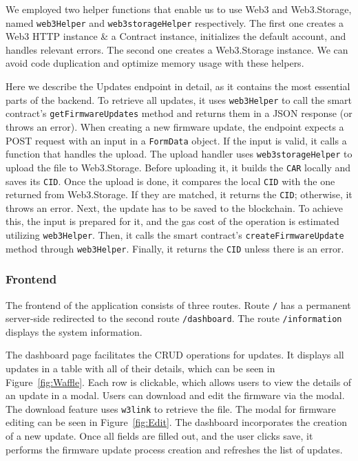 \documentclass[conference]{IEEEtran}
\begin{document}
We employed two helper functions that enable us to use Web3 and Web3.Storage, named \texttt{web3Helper} and \texttt{web3storageHelper} respectively. The first one creates a Web3 HTTP instance \& a Contract instance, initializes the default account, and handles relevant errors. The second one creates a Web3.Storage instance. We can avoid code duplication and optimize memory usage with these helpers.

Here we describe the Updates endpoint in detail, as it contains the most essential parts of the backend. To retrieve all updates, it uses \texttt{web3Helper} to call the smart contract's \texttt{getFirmwareUpdates} method and returns them in a JSON response (or throws an error). When creating a new firmware update, the endpoint expects a POST request with an input in a \texttt{FormData} object. If the input is valid, it calls a function that handles the upload. The upload handler uses \texttt{web3storageHelper} to upload the file to Web3.Storage. Before uploading it, it builds the \texttt{CAR} locally and saves its \texttt{CID}. Once the upload is done, it compares the local \texttt{CID} with the one returned from Web3.Storage. If they are matched, it returns the \texttt{CID}; otherwise, it throws an error. Next, the update has to be saved to the blockchain. To achieve this, the input is prepared for it, and the gas cost of the operation is estimated utilizing \texttt{web3Helper}. Then, it calls the smart contract's \texttt{createFirmwareUpdate} method through \texttt{web3Helper}. Finally, it returns the \texttt{CID} unless there is an error. %


\subsubsection{Frontend}

The frontend of the application consists of three routes. Route \texttt{/} has a permanent server-side redirected to the second route \texttt{/dashboard}. The route \texttt{/information} displays the system information.

The dashboard page facilitates the CRUD operations for updates. It displays all updates in a table with all of their details, which can be seen in Figure~\ref{fig:Waffle}. Each row is clickable, which allows users to view the details of an update in a modal. Users can download and edit the firmware via the modal. The download feature uses \texttt{w3link} to retrieve the file. The modal for firmware editing can be seen in Figure~\ref{fig:Edit}. The dashboard incorporates the creation of a new update. Once all fields are filled out, and the user clicks save, it performs the firmware update process creation and refreshes the list of updates. %
\end{document}
